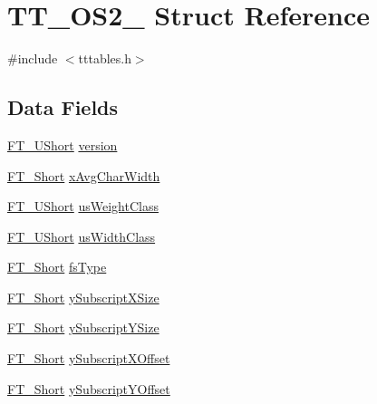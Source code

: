 \hypertarget{struct_t_t___o_s2__}{}\section{T\+T\+\_\+\+O\+S2\+\_\+ Struct Reference}
\label{struct_t_t___o_s2__}


{\ttfamily \#include $<$tttables.\+h$>$}

\subsection*{Data Fields}
\begin{DoxyCompactItemize}
\item 
\hyperlink{fttypes_8h_a937f6c17cf5ffd09086d8610c37b9f58}{F\+T\+\_\+\+U\+Short} \hyperlink{struct_t_t___o_s2___a012ff79224cd25ae51837ca8937605c4}{version}
\item 
\hyperlink{fttypes_8h_aa7279be89046a2563cd3d4d6651fbdcf}{F\+T\+\_\+\+Short} \hyperlink{struct_t_t___o_s2___af903883918479780d17a72f6fee992bd}{x\+Avg\+Char\+Width}
\item 
\hyperlink{fttypes_8h_a937f6c17cf5ffd09086d8610c37b9f58}{F\+T\+\_\+\+U\+Short} \hyperlink{struct_t_t___o_s2___af4d8ab32a27382ea95b882d9e2615ec9}{us\+Weight\+Class}
\item 
\hyperlink{fttypes_8h_a937f6c17cf5ffd09086d8610c37b9f58}{F\+T\+\_\+\+U\+Short} \hyperlink{struct_t_t___o_s2___a8ef38b9f9c65a65aa6abf92e19236146}{us\+Width\+Class}
\item 
\hyperlink{fttypes_8h_aa7279be89046a2563cd3d4d6651fbdcf}{F\+T\+\_\+\+Short} \hyperlink{struct_t_t___o_s2___a8c37e3fa40954af5e5f9206eb6631eb7}{fs\+Type}
\item 
\hyperlink{fttypes_8h_aa7279be89046a2563cd3d4d6651fbdcf}{F\+T\+\_\+\+Short} \hyperlink{struct_t_t___o_s2___a3ae8d803a5055564e9f8a3926200e39c}{y\+Subscript\+X\+Size}
\item 
\hyperlink{fttypes_8h_aa7279be89046a2563cd3d4d6651fbdcf}{F\+T\+\_\+\+Short} \hyperlink{struct_t_t___o_s2___afb1b8ed1ea98badd4de58ff47b54c4c2}{y\+Subscript\+Y\+Size}
\item 
\hyperlink{fttypes_8h_aa7279be89046a2563cd3d4d6651fbdcf}{F\+T\+\_\+\+Short} \hyperlink{struct_t_t___o_s2___ab471c53b6e8a1c1f81cc410959bb5851}{y\+Subscript\+X\+Offset}
\item 
\hyperlink{fttypes_8h_aa7279be89046a2563cd3d4d6651fbdcf}{F\+T\+\_\+\+Short} \hyperlink{struct_t_t___o_s2___a94902b1f33ded0ea4c0555d54a0750fa}{y\+Subscript\+Y\+Offset}
\item 

\end{DoxyCompactItemize}
